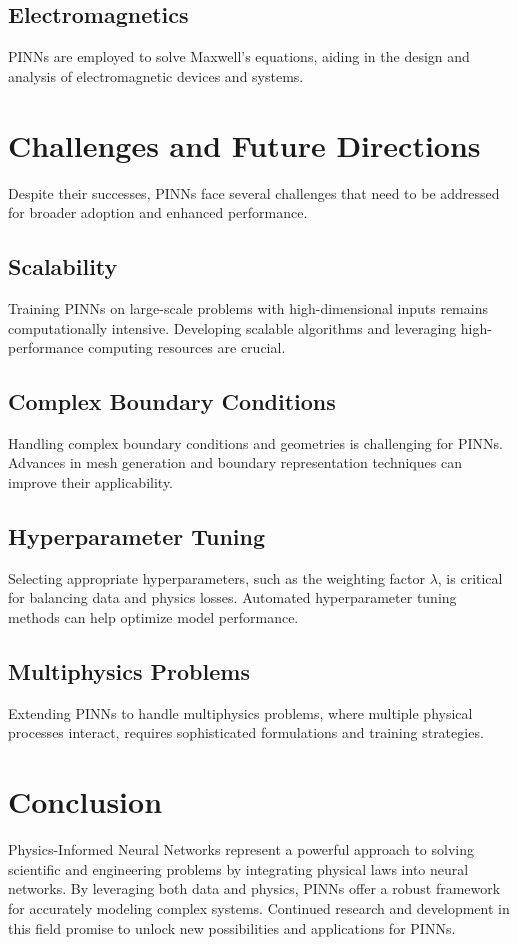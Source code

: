 \subsection{Electromagnetics}
PINNs are employed to solve Maxwell's equations, aiding in the design and analysis of electromagnetic devices and systems.

\section{Challenges and Future Directions}
Despite their successes, PINNs face several challenges that need to be addressed for broader adoption and enhanced performance.

\subsection{Scalability}
Training PINNs on large-scale problems with high-dimensional inputs remains computationally intensive. Developing scalable algorithms and leveraging high-performance computing resources are crucial.

\subsection{Complex Boundary Conditions}
Handling complex boundary conditions and geometries is challenging for PINNs. Advances in mesh generation and boundary representation techniques can improve their applicability.

\subsection{Hyperparameter Tuning}
Selecting appropriate hyperparameters, such as the weighting factor \( \lambda \), is critical for balancing data and physics losses. Automated hyperparameter tuning methods can help optimize model performance.

\subsection{Multiphysics Problems}
Extending PINNs to handle multiphysics problems, where multiple physical processes interact, requires sophisticated formulations and training strategies.

\section{Conclusion}
Physics-Informed Neural Networks represent a powerful approach to solving scientific and engineering problems by integrating physical laws into neural networks. By leveraging both data and physics, PINNs offer a robust framework for accurately modeling complex systems. Continued research and development in this field promise to unlock new possibilities and applications for PINNs.

% 
% 

